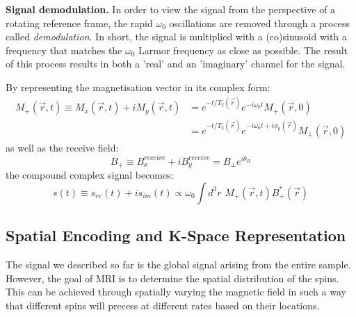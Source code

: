 \textbf{Signal demodulation.} In order to view the signal from the perspective of a rotating reference frame, the rapid $\omega_0$ oscillations are removed through a process called \textit{demodulation}.
In short, the signal is multiplied with a (co)sinusoid with a frequency that matches the $\omega_0$ Larmor frequency as close as possible.
The result of this process results in both a 'real' and an 'imaginary' channel for the signal.

By representing the magnetisation vector in its complex form:
\begin{equation}\label{eq:716}
\begin{aligned}
    M_{+}(\vec{r},t) \equiv M_x(\vec{r},t) + i M_y(\vec{r},t) &= e^{- t/T_2(\vec{r})} e^{-i \omega_0 t } M_+(\vec{r},0) \\
    &= e^{- t/T_2(\vec{r})} e^{-i \omega_0 t + i \phi_0(\vec{r})} M_{\perp}(\vec{r},0)
\end{aligned}
\end{equation}
as well as the receive field:
\begin{equation}\label{eq:729}
    B_{+} \equiv B_x^{receive} + i B_y^{receive} = B_{\perp} e^{i \theta_B}
\end{equation}
the compound complex signal becomes:
\begin{equation}\label{eq:730}
    s(t) \equiv s_{re}(t) + i s_{im}(t) \propto \omega_0 \int d^3 r \, \,  M_{+}(\vec{r},t) B^*_{+}(\vec{r})
\end{equation}

\hfill

\subsection{Spatial Encoding and K-Space Representation}

The signal we described so far is the global signal arising from the entire sample.
However, the goal of MRI is to determine the spatial distribution of the spins.
This can be achieved through spatially varying the magnetic field in such a way that different spins will precess at different rates based on their locations.

\hfill 

